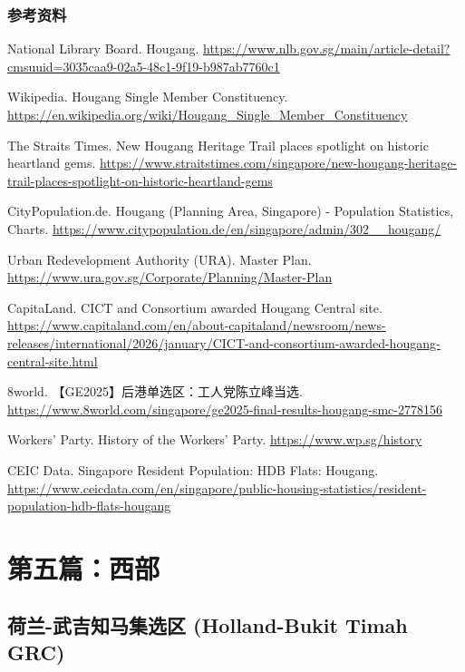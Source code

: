\documentclass[11pt,a4paper,twoside,openany]{book}
\begin{document}
\section*{参考资料}
\begin{enumerate}[label={[\arabic*]},leftmargin=*,topsep=2pt,itemsep=1pt,parsep=0pt]
  \item National Library Board. Hougang. \url{https://www.nlb.gov.sg/main/article-detail?cmsuuid=3035caa9-02a5-48c1-9f19-b987ab7760c1}
  \item Wikipedia. Hougang Single Member Constituency. \url{https://en.wikipedia.org/wiki/Hougang_Single_Member_Constituency}
  \item The Straits Times. New Hougang Heritage Trail places spotlight on historic heartland gems. \url{https://www.straitstimes.com/singapore/new-hougang-heritage-trail-places-spotlight-on-historic-heartland-gems}
  \item CityPopulation.de. Hougang (Planning Area, Singapore) - Population Statistics, Charts. \url{https://www.citypopulation.de/en/singapore/admin/302__hougang/}
  \item Urban Redevelopment Authority (URA). Master Plan. \url{https://www.ura.gov.sg/Corporate/Planning/Master-Plan}
  \item CapitaLand. CICT and Consortium awarded Hougang Central site. \url{https://www.capitaland.com/en/about-capitaland/newsroom/news-releases/international/2026/january/CICT-and-consortium-awarded-hougang-central-site.html}
  \item 8world. 【GE2025】后港单选区：工人党陈立峰当选. \url{https://www.8world.com/singapore/ge2025-final-results-hougang-smc-2778156}
  \item Workers' Party. History of the Workers' Party. \url{https://www.wp.sg/history}
  \item CEIC Data. Singapore Resident Population: HDB Flats: Hougang. \url{https://www.ceicdata.com/en/singapore/public-housing-statistics/resident-population-hdb-flats-hougang}
\end{enumerate}


\part{第五篇：西部}

\chapter{荷兰-武吉知马集选区 (Holland-Bukit Timah GRC)}
\end{document}
